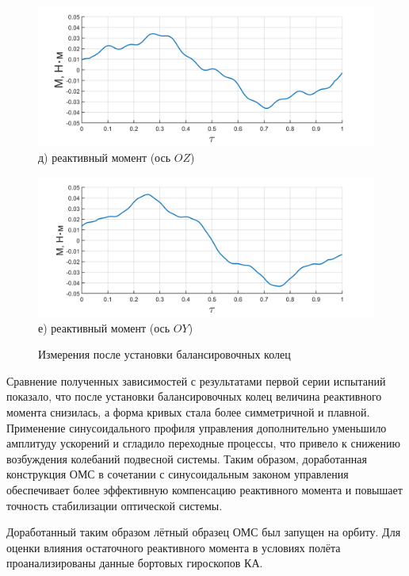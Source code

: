 \begin{figure}[h!]
	\begin{minipage}[b]{0.49\linewidth}\centering
		\includegraphics[width=\linewidth]{matlab/img/oz-gyro-sin-mom} \\ д) реактивный момент (ось $OZ$)
	\end{minipage}
	\hfill
	\begin{minipage}[b]{0.49\linewidth}\centering
		\includegraphics[width=\linewidth]{matlab/img/oy-gyro-sin-mom} \\ е)  реактивный момент (ось $OY$)
	\end{minipage}
	\vspace{0.5em} %
	\caption{Измерения после установки балансировочных колец}
	\label{fig:sin-profile-omn}
\end{figure}

Сравнение полученных зависимостей с результатами первой серии испытаний показало, что после установки балансировочных колец величина реактивного момента снизилась, а форма кривых стала более симметричной и плавной. Применение синусоидального профиля управления дополнительно уменьшило амплитуду ускорений и сгладило переходные процессы, что привело к снижению возбуждения колебаний подвесной системы. Таким образом, доработанная конструкция ОМС в сочетании с синусоидальным законом управления обеспечивает более эффективную компенсацию реактивного момента и повышает точность стабилизации оптической системы.

Доработанный таким образом лётный образец ОМС был запущен на орбиту. Для оценки влияния остаточного реактивного момента в условиях полёта
проанализированы данные бортовых гироскопов КА.

